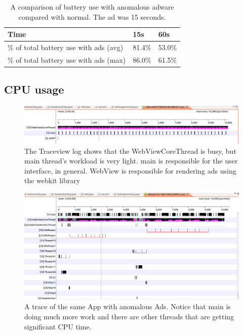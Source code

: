 \begin{table}%
\centering 
\scriptsize
\caption{A comparison of battery use with anomalous adware compared with normal.
The ad was 15 seconds.}
\label{table:battery}
\begin{tabular}{|l||l|l|}
    \hline
    {\bf Time} & {\bf 15s} & {\bf 60s}  \\
    \hline
    \% of total battery use with ads (avg)  & 81.4\%   & 53.0\%    \\
    \hline
    \% of total battery use with ads (max) & 86.0\%  & 61.5\%   \\
    \hline 
\end{tabular}

\end{table}

\subsection{CPU usage}

\begin{figure}[ht]
\centering
\includegraphics[width=6in]{no_AdsDisplay_10s.png}
\caption{The Traceview log shows that the
WebViewCoreThread is busy, but main thread's workload is very light.  main is responsible for 
the user interface, in general.  WebView is responsible for rendering ads using the webkit library}
\label{fig:cpu-no-ad}
\end{figure}

\begin{figure}[ht]
\centering
\includegraphics[width=6in]{traceview.png}
\caption{A trace of the same App with anomalous Ads.  Notice that main is doing much more work and
there are other threads that are getting significant CPU time.}
\label{fig:cpu-ad}
\end{figure}

